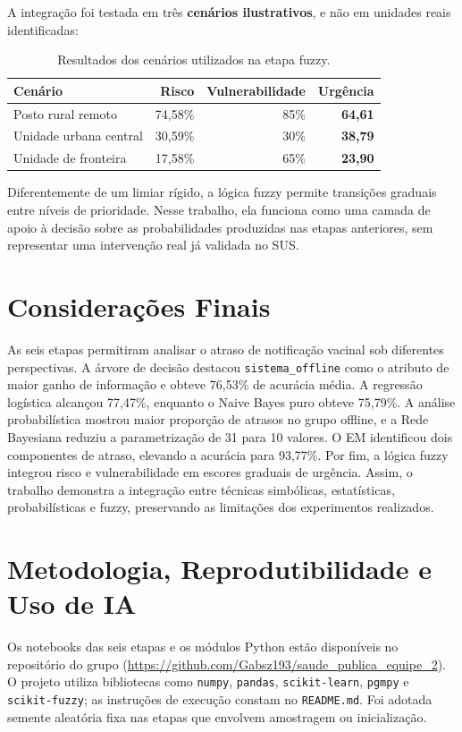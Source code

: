 \documentclass[12pt]{article}
\begin{document}
A integração foi testada em três \textbf{cenários ilustrativos}, e não em unidades reais identificadas:
\begin{table}[H]
\centering
\caption{Resultados dos cenários utilizados na etapa fuzzy.}
\begin{tabular}{@{}lrrr@{}}
\toprule
\textbf{Cenário} & \textbf{Risco} & \textbf{Vulnerabilidade} & \textbf{Urgência} \\
\midrule
Posto rural remoto & 74,58\% & 85\% & \textbf{64,61} \\
Unidade urbana central & 30,59\% & 30\% & \textbf{38,79} \\
Unidade de fronteira & 17,58\% & 65\% & \textbf{23,90} \\
\bottomrule
\end{tabular}
\end{table}

Diferentemente de um limiar rígido, a lógica fuzzy permite transições graduais entre níveis de prioridade. Nesse trabalho, ela funciona como uma camada de apoio à decisão sobre as probabilidades produzidas nas etapas anteriores, sem representar uma intervenção real já validada no SUS.

\section{Considerações Finais}

As seis etapas permitiram analisar o atraso de notificação vacinal sob diferentes perspectivas. A árvore de decisão destacou \texttt{sistema\_offline} como o atributo de maior ganho de informação e obteve 76,53\% de acurácia média. A regressão logística alcançou 77,47\%, enquanto o Naive Bayes puro obteve 75,79\%. A análise probabilística mostrou maior proporção de atrasos no grupo offline, e a Rede Bayesiana reduziu a parametrização de 31 para 10 valores. O EM identificou dois componentes de atraso, elevando a acurácia para 93,77\%. Por fim, a lógica fuzzy integrou risco e vulnerabilidade em escores graduais de urgência. Assim, o trabalho demonstra a integração entre técnicas simbólicas, estatísticas, probabilísticas e fuzzy, preservando as limitações dos experimentos realizados.

\appendix
\section{Metodologia, Reprodutibilidade e Uso de IA}

Os notebooks das seis etapas e os módulos Python estão disponíveis no repositório do grupo (\url{https://github.com/Gabsz193/saude_publica_equipe_2}). O projeto utiliza bibliotecas como \texttt{numpy}, \texttt{pandas}, \texttt{scikit-learn}, \texttt{pgmpy} e \texttt{scikit-fuzzy}; as instruções de execução constam no \texttt{README.md}. Foi adotada semente aleatória fixa nas etapas que envolvem amostragem ou inicialização.
\end{document}
